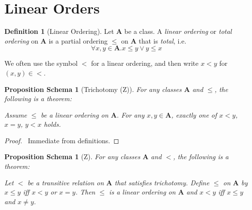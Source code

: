 \documentclass{book}
\let\qed\relax
\newtheorem{props}[ax]{Proposition Schema}
\theoremstyle{definition}
\newtheorem{df}[ax]{Definition}
\begin{document}
\section{Linear Orders}

\begin{df}[Linear Ordering]
Let $\mathbf{A}$ be a class. A \emph{linear ordering} or \emph{total ordering} on $\mathbf{A}$ is a partial ordering $\leq$ on $\mathbf{A}$ that is \emph{total}, i.e.
\[ \forall x,y \in \mathbf{A}. x \leq y \vee y \leq x \]

We often use the symbol $<$ for a linear ordering, and then write $x < y$ for $(x,y) \in <$.
\end{df}

\begin{props}[Trichotomy (Z)]
For any classes $\mathbf{A}$ and $\leq$, the following is a theorem:

Assume $\leq$ be a linear ordering on $\mathbf{A}$. For any $x,y \in \mathbf{A}$, exactly one of $x < y$, $x = y$, $y < x$ holds.
\end{props}

\begin{proof}
\pf\ Immediate from definitions. \qed
\end{proof}

\begin{props}[Z]
\label{prop:linord}
For any classes $\mathbf{A}$ and $<$, the following is a theorem:

Let $<$ be a transitive relation on $\mathbf{A}$ that satisfies trichotomy. Define $\leq$ on $\mathbf{A}$ by $x \leq y$ iff $x < y$ or $x = y$. Then $\leq$ is a linear ordering on $\mathbf{A}$ and $x < y$ iff $x \leq y$ and $x \neq y$.
\end{props}
\end{document}

